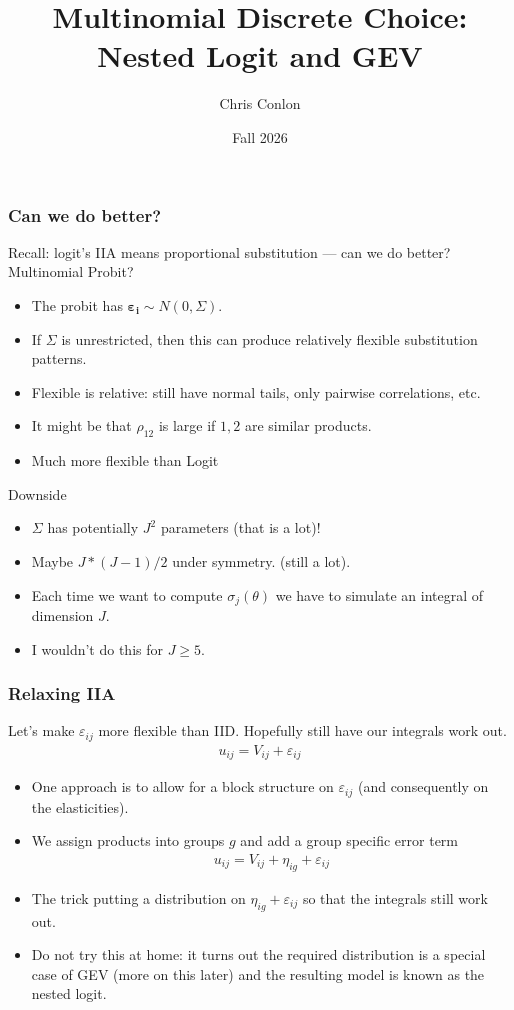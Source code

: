 \documentclass[aspectratio=169,11pt]{beamer}
\begin{document}
\title{Multinomial Discrete Choice: Nested Logit and GEV}
\author{Chris Conlon}
\date{Fall 2026}

\frame{\titlepage}

\begin{frame}
\frametitle{Can we do better?}
Recall: logit's IIA means proportional substitution --- can we do better? Multinomial Probit?
\begin{itemize}
\item The probit has $\symbf{\varepsilon_i} \sim N(0,\Sigma)$.
\item If $\Sigma$ is unrestricted, then this can produce relatively flexible substitution patterns.
\item Flexible is relative: still have normal tails, only pairwise correlations, etc.
\item It might be that $\rho_{12}$ is large if $1,2$ are similar products.
\item Much more flexible than Logit
\end{itemize}
Downside
\begin{itemize}
\item $\Sigma$ has potentially $J^2$ parameters (that is a lot)!
\item Maybe $J * (J-1)/2$ under symmetry. (still a lot).
\item Each time we want to compute $\sigma_j(\theta)$ we have to simulate an integral of dimension $J$.
\item I wouldn't do this for $J \geq 5$.
\end{itemize}
\end{frame}




\begin{frame}
\frametitle{Relaxing IIA}
Let's make $\varepsilon_{ij}$ more flexible than IID. Hopefully still have our integrals work out.
\begin{align*}
u_{ij} =   V_{ij}  + \varepsilon_{ij}
\end{align*}
\begin{itemize}
\item One approach is to allow for a block structure on $\varepsilon_{ij}$ (and consequently on the elasticities).
\item We assign products into groups $g$ and add a group specific error term
\begin{align*}
u_{ij} =V_{ij}  + \eta_{ig} + \varepsilon_{ij}
\end{align*}
\item The trick putting a distribution on $\eta_{ig} + \varepsilon_{ij}$ so that the integrals still work out.
\item Do not try this at home: it turns out the required distribution is a special case of \alert{GEV} (more on this later) and the resulting model is known as the \alert{nested logit}.
\end{itemize}
\end{frame}
\end{document}
